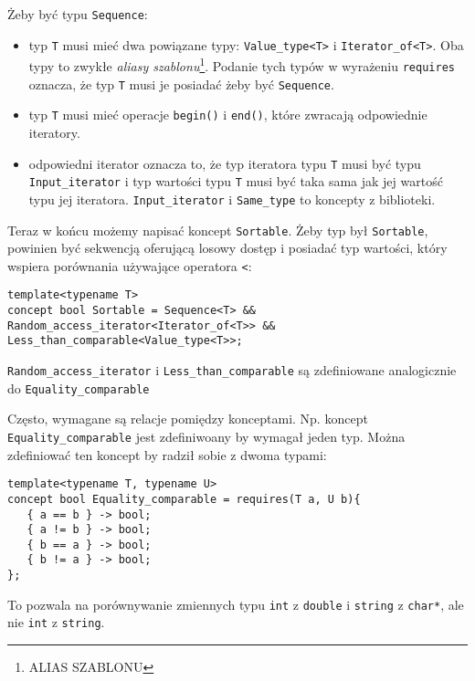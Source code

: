 \documentclass[11pt, a4paper]{article}
\begin{document}
Żeby być typu \verb#Sequence#:

\begin{itemize}

\item typ \verb#T# musi mieć dwa powiązane typy: \verb#Value_type<T># i \verb#Iterator_of<T>#. Oba typy to zwykłe \emph{aliasy szablonu}\footnote{ALIAS SZABLONU}. Podanie tych typów w wyrażeniu \verb#requires# oznacza, że typ \verb#T# musi je posiadać żeby być \verb#Sequence#.

\item typ \verb#T# musi mieć operacje \verb#begin()# i \verb#end()#, które zwracają odpowiednie iteratory.

\item odpowiedni iterator oznacza to, że typ iteratora typu \verb#T# musi być typu \verb#Input_iterator# i typ wartości typu \verb#T# musi być taka sama jak jej wartość typu jej iteratora. \verb#Input_iterator# i \verb#Same_type# to koncepty z biblioteki.

\end{itemize}

Teraz w końcu możemy napisać koncept \verb#Sortable#. Żeby typ był \verb#Sortable#, powinien być sekwencją oferującą losowy dostęp i posiadać typ wartości, który wspiera porównania używające operatora \verb#<#:

\begin{lstlisting}[frame=single]
template<typename T>
concept bool Sortable = Sequence<T> &&
Random_access_iterator<Iterator_of<T>> &&
Less_than_comparable<Value_type<T>>;
\end{lstlisting}

\verb#Random_access_iterator# i \verb#Less_than_comparable# są zdefiniowane analogicznie do \verb#Equality_comparable#

Często, wymagane są relacje pomiędzy konceptami. Np. koncept \newline \verb#Equality_comparable# jest zdefiniwoany by wymagał jeden typ. Można zdefiniować ten koncept by radził sobie z dwoma typami:

\begin{lstlisting}[frame=single]
template<typename T, typename U>
concept bool Equality_comparable = requires(T a, U b){
   { a == b } -> bool;
   { a != b } -> bool;
   { b == a } -> bool;
   { b != a } -> bool;
};
\end{lstlisting}

To pozwala na porównywanie zmiennych typu \verb#int# z \verb#double# i \verb#string# z \verb#char*#, ale nie \verb#int# z \verb#string#.
\end{document}
